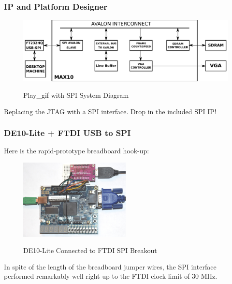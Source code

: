 \documentclass{beamer}
\begin{document}
\begin{frame}
\frametitle{IP and Platform Designer}

\begin{figure}[h]
	\centering
	\includegraphics[width=1.0\textwidth]{graphics/spi_avalon_system}
	\centering\bfseries
	\caption{Play\_gif with SPI System Diagram}
\end{figure}

Replacing the JTAG with a SPI interface.  Drop in the included SPI IP!

\end{frame}

\begin{frame}
\frametitle{DE10-Lite + FTDI USB to SPI}

Here is the rapid-prototype breadboard hook-up:

\begin{figure}[h]
	\centering
	\includegraphics[width=0.5\textwidth]{graphics/de10_spi}
	\centering\bfseries
	\caption{DE10-Lite Connected to FTDI SPI Breakout}
\end{figure}

In spite of the length of the breadboard jumper wires, the SPI interface performed remarkably well right up to the FTDI clock limit of 30 MHz.

\end{frame}
\end{document}

